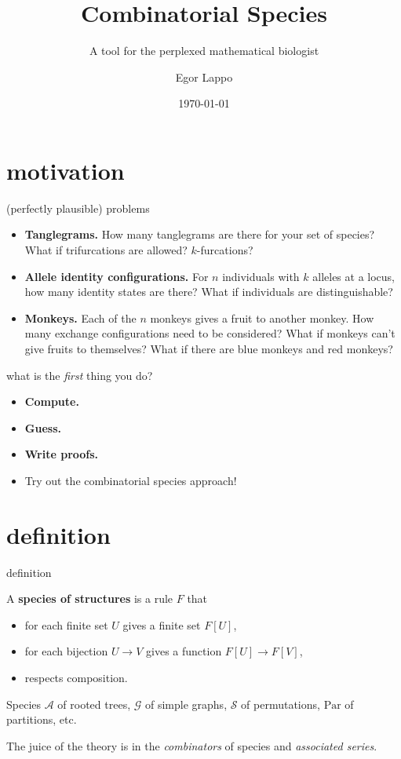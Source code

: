 \documentclass{beamer}
\title{Combinatorial Species}
\subtitle{A tool for the perplexed mathematical biologist}
\date{\today}
\author{Egor Lappo}
\institute{Rosenberg Lab}
\begin{document}
\maketitle
\section{motivation}

\begin{frame}{(perfectly plausible) problems}
  \begin{itemize}
    \item \textbf{Tanglegrams.} How many tanglegrams are there for your set of species? \pause What if trifurcations are allowed? \pause $k$-furcations? \pause
    \item \textbf{Allele identity configurations.} For $n$ individuals with $k$ alleles at a locus, how many identity states are there? \pause What if individuals are distinguishable? \pause
    \item \textbf{Monkeys.} Each of the $n$ monkeys gives a fruit to another monkey. How many exchange configurations need to be considered? \pause What if monkeys can't give fruits to themselves? \pause What if there are blue monkeys and red monkeys?
  \end{itemize}
\end{frame}

\begin{frame}{what is the \emph{first} thing you do?}
  \pause
  \begin{itemize}
    \item \textbf{Compute.} \pause
    \item \textbf{Guess.} \pause
    \item \textbf{Write proofs.} \pause
    \item Try out the combinatorial species approach!
  \end{itemize}
\end{frame}

\section{definition}

\begin{frame}{definition}
  \begin{definition}
    A \textbf{species of structures} is a rule $F$ that
    \begin{itemize}
      \item for each finite set $U$ gives a finite set $F[U]$,
      \item for each bijection $U\to V$ gives a function $F[U] \to F[V]$,
      \item respects composition.
    \end{itemize}
  \end{definition} \pause
  \begin{example}
    Species $\mathcal A$ of rooted trees, $\mathcal G$ of simple graphs, $\mathcal S$ of permutations, $\mathrm{Par}$ of partitions, etc.
  \end{example} \pause
  The juice of the theory is in the \emph{combinators} of species and \emph{associated series}.
\end{frame}
\end{document}
